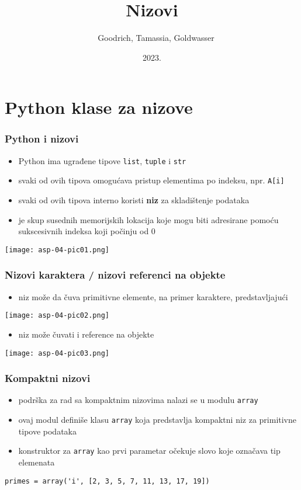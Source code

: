 \documentclass[compress,aspectratio=169]{beamer}
\title{Nizovi}
\author{\textcopyright \ \ Goodrich, Tamassia, Goldwasser}
\institute{Katedra za informatiku, Fakultet tehničkih nauka, Univerzitet u
Novom Sadu}
\date{2023.}
\begin{document}
\frame{\titlepage}

\section[Python]{Python klase za nizove}
\begin{frame}[fragile]
  \frametitle{Python i nizovi}
  \begin{itemize}
    \item Python ima ugrađene tipove \texttt{list}, \texttt{tuple} i
    \texttt{str}
    \item svaki od ovih tipova omogućava pristup elementima po indeksu, npr.
    \texttt{A[i]}
    \item svaki od ovih tipova interno koristi \textbf{niz} za skladištenje
    podataka
    \item {} je skup susednih memorijskih lokacija koje mogu biti
    adresirane pomoću sukscesivnih indeksa koji počinju od 0
  \end{itemize}
  \begin{center}
    \texttt{[image: asp-04-pic01.png]}
  \end{center}
\end{frame}


\begin{frame}[fragile]
  \frametitle{Nizovi karaktera / nizovi referenci na objekte}
  \begin{itemize}
    \item niz može da čuva primitivne elemente, na primer karaktere,
    predstavljajući 
  \end{itemize}
  \begin{center}
    \texttt{[image: asp-04-pic02.png]}
  \end{center}
  \begin{itemize}
    \item niz može čuvati i reference na objekte
  \end{itemize}
  \begin{center}
    \texttt{[image: asp-04-pic03.png]}
  \end{center}
\end{frame}

\begin{frame}[fragile]
  \frametitle{Kompaktni nizovi}
  \begin{itemize}
    \item podrška za rad sa kompaktnim nizovima nalazi se u modulu
    \texttt{array}
    \item ovaj modul definiše klasu \texttt{array} koja predstavlja kompaktni
    niz za primitivne tipove podataka
    \item konstruktor za \texttt{array} kao prvi parametar očekuje slovo koje
    označava tip elemenata
  \end{itemize}
\begin{verbatim}
primes = array('i', [2, 3, 5, 7, 11, 13, 17, 19])
\end{verbatim}
\end{frame}
\end{document}
